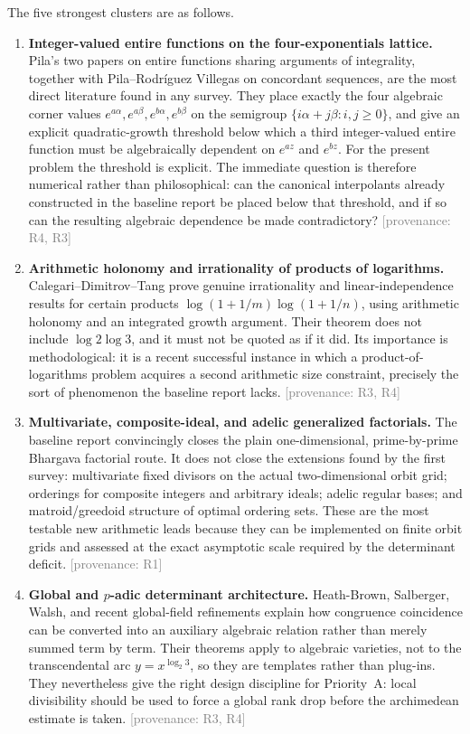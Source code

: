 \documentclass[10pt,letterpaper]{article}
\newcommand{\Rone}{\textsf{R1}}
\newcommand{\Rthree}{\textsf{R3}}
\newcommand{\Rfour}{\textsf{R4}}
\newcommand{\reports}[1]{\textcolor{graytext}{\footnotesize[provenance: #1]}}
\begin{document}
The five strongest clusters are as follows.

\begin{enumerate}
\item \textbf{Integer-valued entire functions on the four-exponentials lattice.}
Pila's two papers on entire functions sharing arguments of integrality, together with
Pila--Rodr\'iguez Villegas on concordant sequences, are the most direct literature found in
any survey.  They place exactly the four algebraic corner values
\(e^{a\alpha},e^{a\beta},e^{b\alpha},e^{b\beta}\) on the semigroup
\(\{i\alpha+j\beta:i,j\geq 0\}\), and give an explicit quadratic-growth threshold below
which a third integer-valued entire function must be algebraically dependent on
\(e^{az}\) and \(e^{bz}\).  For the present problem the threshold is explicit.  The immediate
question is therefore numerical rather than philosophical: can the canonical interpolants
already constructed in the baseline report be placed below that threshold, and if so can
the resulting algebraic dependence be made contradictory?
\reports{\Rfour, \Rthree}

\item \textbf{Arithmetic holonomy and irrationality of products of logarithms.}
Calegari--Dimitrov--Tang prove genuine irrationality and linear-independence results for
certain products \(\log(1+1/m)\log(1+1/n)\), using arithmetic holonomy and an integrated
growth argument.  Their theorem does not include \(\log 2\log 3\), and it must not be quoted
as if it did.  Its importance is methodological: it is a recent successful instance in which
a product-of-logarithms problem acquires a second arithmetic size constraint, precisely the
sort of phenomenon the baseline report lacks.
\reports{\Rthree, \Rfour}

\item \textbf{Multivariate, composite-ideal, and adelic generalized factorials.}
The baseline report convincingly closes the plain one-dimensional, prime-by-prime Bhargava
factorial route.  It does not close the extensions found by the first survey: multivariate
fixed divisors on the actual two-dimensional orbit grid; orderings for composite integers
and arbitrary ideals; adelic regular bases; and matroid/greedoid structure of optimal
ordering sets.  These are the most testable new arithmetic leads because they can be
implemented on finite orbit grids and assessed at the exact asymptotic scale required by the
determinant deficit.
\reports{\Rone}

\item \textbf{Global and \(p\)-adic determinant architecture.}
Heath-Brown, Salberger, Walsh, and recent global-field refinements explain how congruence
coincidence can be converted into an auxiliary algebraic relation rather than merely summed
term by term.  Their theorems apply to algebraic varieties, not to the transcendental arc
\(y=x^{\log_2 3}\), so they are templates rather than plug-ins.  They nevertheless give the
right design discipline for Priority~A: local divisibility should be used to force a global
rank drop before the archimedean estimate is taken.
\reports{\Rthree, \Rfour}


\end{enumerate}
\end{document}
